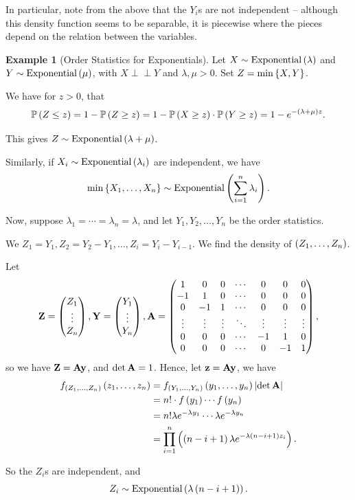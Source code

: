 \documentclass{article}
\theoremstyle{definition}
\newtheorem{example}[theorem]{Example}
\theoremstyle{remark}
\DeclarePairedDelimiter{\abs}{\lvert}{\rvert}
\newcommand{\Prob}{\mathbb{P}}
\newcommand{\indp}{\mathrel{\perp\!\!\!\perp}}
\newcommand{\pmqty}[1]{\begin{pmatrix}#1\end{pmatrix}}
\newcommand{\Exponential}{\operatorname{Exponential}}
\begin{document}
In particular, note from the above that the \(Y_i\)s are not independent -- although this density function seems to be separable, it is piecewise where the pieces depend on the relation between the variables.

\begin{example}[Order Statistics for Exponentials]
    \label{ex:order-statistics-exp}%
    Let \(X \sim \Exponential \pqty{\lambda}\) and \(Y \sim \Exponential \pqty{\mu}\), with \(X \indp Y\) and \(\lambda, \mu > 0\). Set \(Z = \min\left\{X, Y\right\}\).

    We have for \(z > 0\), that
    \[
        \Prob\pqty{Z \leq z} = 1 - \Prob\pqty{Z \geq z} = 1 - \Prob\pqty{X \geq z} \cdot \Prob\pqty{Y \geq z} = 1 - e^{- \pqty{\lambda + \mu} z}.
    \]

    This gives \(Z \sim \Exponential\pqty{\lambda + \mu}\).

    Similarly, if \(X_i \sim \Exponential \pqty{\lambda_i}\) are independent, we have
    \[
        \min\Bqty{X_1, \ldots, X_n} \sim \Exponential\pqty{\sum_{i = 1}^{n} \lambda_i}.
    \]

    Now, suppose \(\lambda_1 = \cdots = \lambda_n = \lambda\), and let \(Y_1, Y_2, \ldots, Y_n\) be the order statistics.

    We \(Z_1 = Y_1, Z_2 = Y_2 - Y_1, \ldots, Z_i = Y_i - Y_{i - 1}\). We find the density of \(\left(Z_1, \ldots, Z_n\right)\).

    Let
    \[
        \vb{Z} = \pmqty{Z_1 \\ \vdots \\ Z_n},
        \vb{Y} = \pmqty{Y_1 \\ \vdots \\ Y_n},
        \vb{A} = \pmqty{
             1 &  0 & 0 & \cdots &  0 &  0 &  0 \\
            -1 &  1 & 0 & \cdots &  0 &  0 &  0 \\
             0 & -1 & 1 & \cdots &  0 &  0 &  0 \\
             \vdots & \vdots & \vdots & \ddots & \vdots & \vdots & \vdots \\
             0 &  0 & 0 & \cdots & -1 &  1 & 0 \\
             0 &  0 & 0 & \cdots &  0 & -1 & 1
        },
    \]
    so we have \(\vb{Z} = \vb{A} \vb{y}\), and \(\det \vb{A} = 1\). Hence, let \(\vb{z} = \vb{A} \vb{y}\), we have
    \begin{align*}
        f_{\pqty{Z_1, \ldots, Z_n}} \pqty{z_1, \ldots, z_n} &= f_{\pqty{Y_1, \ldots, Y_n}} \pqty{y_1, \ldots, y_n} \abs{\det \vb{A}} \\
        &= n! \cdot f\pqty{y_1} \cdots f\pqty{y_n} \\
        &= n! \lambda e^{-\lambda y_1} \cdots \lambda e^{-\lambda y_n} \\
        &= \prod_{i = 1}^{n} \pqty{\pqty{n - i + 1} \lambda e^{-\lambda \pqty{n - i + 1} z_i}}.
    \end{align*}

    So the \(Z_i\)s are independent, and
    \[
        Z_i \sim \Exponential\pqty{\lambda \pqty{n - i + 1}}.
    \]
\end{example}
\end{document}
